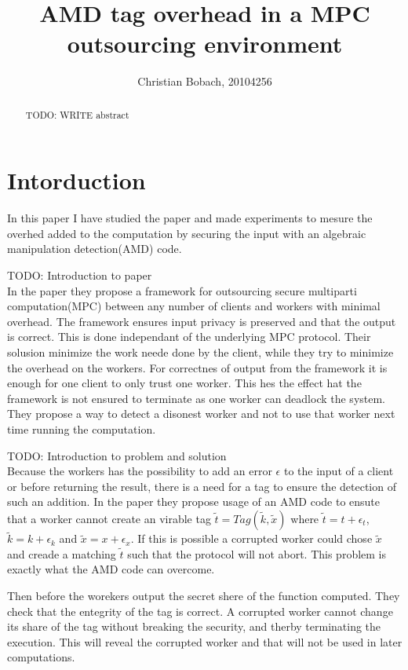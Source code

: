 \documentclass[10pt,a4paper]{article}
\author{Christian Bobach, 20104256}
\title{AMD tag overhead in a MPC outsourcing environment}
\newcommand{\todo}[1]{}
\renewcommand{\todo}[1]{{\color{red} TODO: {#1}} \\}
\begin{document}
\maketitle

\begin{abstract}
\todo{WRITE abstract}

\end{abstract}

\tableofcontents

\section{Intorduction}
In this paper I have studied the paper \cite{fosc} and made experiments to mesure the overhed added to the computation by securing the input with an algebraic manipulation detection(AMD) code.

\todo{Introduction to paper \cite{fosc}}
In the paper they propose a framework for outsourcing secure multiparti computation(MPC) between any number of clients and workers with minimal overhead. The framework ensures input privacy is preserved and that the output is correct. This is done independant of the underlying MPC protocol. Their solusion minimize the work neede done by the client, while they try to minimize the overhead on the workers. For correctnes of output from the framework it is enough for one client to only trust one worker. This hes the effect hat the framework is not ensured to terminate as one worker can deadlock the system. They propose a way to detect a disonest worker and not to use that worker next time running the computation.

\todo{Introduction to problem and solution}
Because the workers has the possibility to add an error $\epsilon$ to the input of a client or before returning the result, there is a need for a tag to ensure the detection of such an addition. In the paper they propose usage of an AMD code to ensute that a worker cannot create an virable tag $\tilde{t}=Tag(\tilde{k},\tilde{x})$ where $\tilde{t}=t+\epsilon_t$, $\tilde{k}=k+\epsilon_k$ and $\tilde{x}=x+\epsilon_x$. If this is possible a corrupted worker could chose $\tilde{x}$ and creade a matching $\tilde{t}$ such that the protocol will not abort. This problem is exactly what the AMD code can overcome.

Then before the worekers output the secret shere of the function computed. They check that the entegrity of the tag is correct. A corrupted worker cannot change its share of the tag without breaking the security, and therby terminating the execution. This will reveal the corrupted worker and that will not be used in later computations. 
\end{document}
